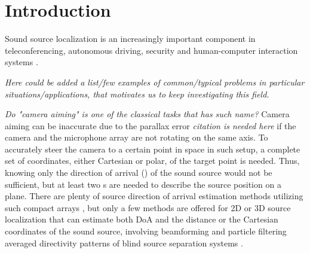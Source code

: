 \documentclass[applsci,article,submit,moreauthors,pdftex]{Definitions/mdpi}
\begin{document}


\section{Introduction}
Sound source localization is an increasingly important component in teleconferencing, autonomous driving, security and human-computer interaction systems \cite{martiSpeakerLocalizationDetection2011,lopatka_detection_2016,valinLocalizationSimultaneousMoving2004}.

\emph{Here could be added a list/few examples of common/typical problems in particular situations/applications, that motivates us to keep investigating this field.}

\emph{Do "camera aiming" is one of the classical tasks that has such name?} Camera aiming can be inaccurate due to the parallax error \emph{citation is needed here} if the camera and the microphone array are not rotating on the same axis. To accurately steer the camera to a certain point in space in such setup, a complete set of coordinates, either Cartesian or polar, of the target point is needed.
Thus, knowing only the direction of arrival (\doa{}) of the sound source would not be sufficient, but at least two \doa{}s are needed to describe the source position on a plane.
There are plenty of source direction of arrival estimation methods utilizing such compact arrays \cite{bruttiComparisonDifferentSound2008,wengThreedimensionalSoundLocalization2001,awad-allaTwostageApproachPassive2020}, but only a few methods are offered for 2D or 3D source localization that can estimate both DoA and the distance or the Cartesian coordinates of the sound source, involving beamforming and particle filtering \cite{valinRobust3DLocalization2006} averaged directivity patterns of blind source separation systems \cite{4959563}.
\end{document}
